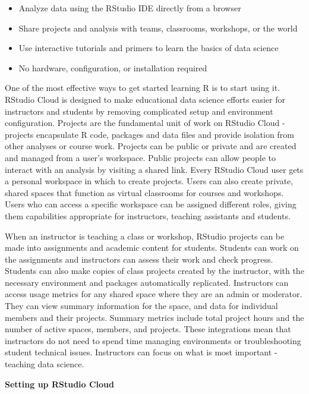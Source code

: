 \begin{itemize}
\tightlist
\item
  Analyze data using the RStudio IDE directly from a browser
\item
  Share projects and analysis with teams, classrooms, workshops, or the
  world
\item
  Use interactive tutorials and primers to learn the basics of data
  science
\item
  No hardware, configuration, or installation required
\end{itemize}

One of the most effective ways to get started learning R is to start
using it. RStudio Cloud is designed to make educational data science
efforts easier for instructors and students by removing complicated
setup and environment configuration. Projects are the fundamental unit
of work on RStudio Cloud - projects encapsulate R code, packages and
data files and provide isolation from other analyses or course work.
Projects can be public or private and are created and managed from a
user's workspace. Public projects can allow people to interact with an
analysis by visiting a shared link. Every RStudio Cloud user gets a
personal workspace in which to create projects. Users can also create
private, shared spaces that function as virtual classrooms for courses
and workshops. Users who can access a specific workspace can be assigned
different roles, giving them capabilities appropriate for instructors,
teaching assistants and students.

When an instructor is teaching a class or workshop, RStudio projects can
be made into assignments and academic content for students. Students can
work on the assignments and instructors can assess their work and check
progress. Students can also make copies of class projects created by the
instructor, with the necessary environment and packages automatically
replicated. Instructors can access usage metrics for any shared space
where they are an admin or moderator. They can view summary information
for the space, and data for individual members and their projects.
Summary metrics include total project hours and the number of active
spaces, members, and projects. These integrations mean that instructors
do not need to spend time managing environments or troubleshooting
student technical issues. Instructors can focus on what is most
important - teaching data science.

\noindent \textbf{Setting up RStudio Cloud}

